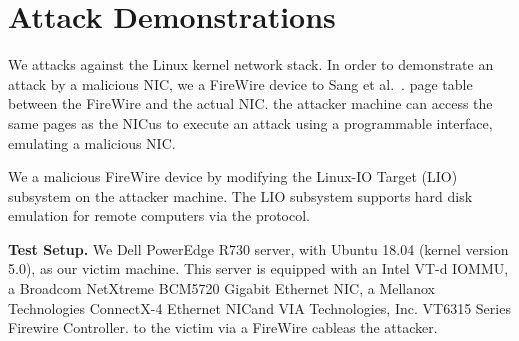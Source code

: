 \section{Attack Demonstrations}\label{Sec:setup}


We \DIFdelbegin {}\DIFdelend \DIFaddbegin {}\DIFaddend \compound attacks against the Linux kernel network stack. 
In order to demonstrate an attack by a malicious NIC, we \DIFdelbegin {}\DIFdelend \DIFaddbegin {}\DIFaddend a FireWire device \DIFdelbegin {}\DIFdelend \DIFaddbegin {}\DIFaddend to Sang et al.~\cite{SLND10}. \DIFdelbegin {}\DIFdelend \DIFaddbegin {}\DIFaddend \iova{} page table \DIFdelbegin {}\DIFdelend \DIFaddbegin {}\DIFaddend between the FireWire and the actual NIC. \DIFdelbegin {}\DIFdelend \DIFaddbegin {}\DIFaddend the attacker machine can access the same pages as the NIC\DIFdelbegin {}\DIFdelend \DIFaddbegin {}\DIFaddend us to execute an attack using a programmable interface, emulating a malicious NIC.


We \DIFdelbegin {}\DIFdelend \DIFaddbegin {}\DIFaddend a malicious FireWire device by modifying the Linux-IO Target (LIO) subsystem on the attacker machine. The LIO subsystem supports hard disk emulation for remote computers via the \spb{} protocol. 

\smallskip
\noindent\textbf{Test Setup.}
We \DIFdelbegin {}\DIFdelend \DIFaddbegin {}\DIFaddend Dell PowerEdge R730 server, with Ubuntu 18.04 (kernel version 5.0), as our victim machine. This server is equipped with an Intel VT-d IOMMU, a Broadcom NetXtreme BCM5720 Gigabit Ethernet NIC, a Mellanox Technologies ConnectX-4 Ethernet NIC\DIFaddbegin \DIFadd{, }\DIFaddend and VIA Technologies, Inc. VT6315 Series Firewire Controller. \DIFdelbegin {}\DIFdelend \DIFaddbegin {}\DIFaddend to the victim via a FireWire cable\DIFdelbegin {}\DIFdelend \DIFaddbegin {}\DIFaddend as the attacker. 

